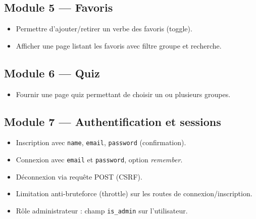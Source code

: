 \documentclass[12pt,a4paper]{article}
\begin{document}
\subsection{Module 5 --- Favoris}
\begin{itemize}[leftmargin=*]
  \item Permettre d'ajouter/retirer un verbe des favoris (toggle).
  \item Afficher une page listant les favoris avec filtre groupe et recherche.
\end{itemize}

\subsection{Module 6 --- Quiz}
\begin{itemize}[leftmargin=*]
  \item Fournir une page quiz permettant de choisir un ou plusieurs groupes.
\end{itemize}

\subsection{Module 7 --- Authentification et sessions}
\begin{itemize}[leftmargin=*]
  \item Inscription avec \texttt{name}, \texttt{email}, \texttt{password} (confirmation).
  \item Connexion avec \texttt{email} et \texttt{password}, option \emph{remember}.
  \item Déconnexion via requête POST (CSRF).
  \item Limitation anti-bruteforce (throttle) sur les routes de connexion/inscription.
  \item Rôle administrateur : champ \texttt{is\_admin} sur l'utilisateur.
\end{itemize}
\end{document}
